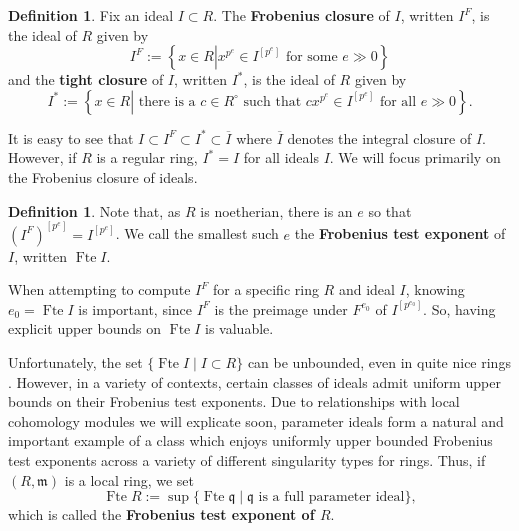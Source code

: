\documentclass{amsproc}
\theoremstyle{definition}
\newtheorem{definition}[theorem]{Definition}
\theoremstyle{remark}
\numberwithin{equation}{section}
\newcommand{\fm}{\mathfrak{m}}
\newcommand{\fq}{\mathfrak{q}}
\newcommand{\fbp}[1]{\left[ #1 \right]}
\newcommand{\fte}{\operatorname{Fte}}
\begin{document}
\begin{definition}\label{dff: tight and frobenius closure}
Fix an ideal $I\subset R$. The \textbf{Frobenius closure} of $I$, written $I^F$, is the ideal of $R$ given by \[I^F := \left\lbrace x \in R \left| x^{p^e} \in I^{\fbp{p^e}} \text{ for some } e \gg 0 \right. \right\rbrace\] and the \textbf{tight closure} of $I$, written $I^*$, is the ideal of $R$ given by \[I^* := \left\lbrace x \in R \left| \text{ there is a } c \in R^\circ \text{ such that } cx^{p^e} \in I^{\fbp{p^e}} \text{ for all } e \gg 0 \right. \right\rbrace.\] 
\end{definition}


\noindent It is easy to see that $I\subset I^F \subset I^* \subset \overline{I}$ where $\overline{I}$ denotes the integral closure of $I$. However, if $R$ is a regular ring, $I^*=I$ for all ideals $I$. We will focus primarily on the Frobenius closure of ideals. 

\begin{definition}\label{dff: Fte}
Note that, as $R$ is noetherian, there is an $e$ so that $(I^F)^{\fbp{p^e}} = I^{\fbp{p^e}}$. We call the smallest such $e$ the \textbf{Frobenius test exponent} of $I$, written $\fte I$. 
\end{definition}

When attempting to compute $I^F$ for a specific ring $R$ and ideal $I$, knowing $e_0=\fte I$ is important, since $I^F$ is the preimage under $F^{e_0}$ of $I^{\fbp{p^{e_0}}}$. So, having explicit upper bounds on $\fte I$ is valuable. 

Unfortunately, the set $\{ \fte I \mid I \subset R\}$ can be unbounded, even in quite nice rings \cite{Bre06}. However, in a variety of contexts, certain classes of ideals admit uniform upper bounds on their Frobenius test exponents. Due to relationships with local cohomology modules we will explicate soon, parameter ideals form a natural and important example of a class which enjoys uniformly upper bounded Frobenius test exponents across a variety of different singularity types for rings. Thus, if $(R,\fm)$ is a local ring, we set $$\fte R := \sup \{ \fte \fq \mid \fq \textrm{ is a full parameter ideal} \},$$ which is called the {\bf Frobenius test exponent of $R$}. 
\end{document}
